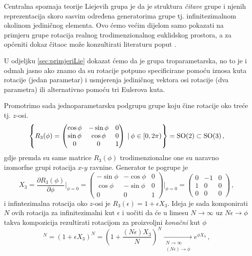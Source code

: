 Centralna spoznaja teorije Liejevih grupa je da je struktura \emph{čitave} grupe i
njenih reprezentacija skoro sasvim određena
generatorima grupe tj. infinitezimalnom okolinom jediničnog 
elementa.
Ovo ćemo većim dijelom samo pokazati na primjeru grupe rotacija realnog
trodimenzionalnog euklidskog prostora, a za općeniti
dokaz čitaoc može konzultirati literaturu poput \cite{Stilwell:2008}.


U odjeljku \ref{sec:primjeriLie} dokazat ćemo da je grupa  troparametarska,
no to je i odmah jasno ako znamo da su rotacije potpuno specificirane pomoću
iznosa kuta rotacije (jedan parametar) i usmjerenja jediničnog vektora osi rotacije (dva parametra)
ili alternativno pomoću tri Eulerova kuta.

Promotrimo sada jednoparametarsku podgrupu grupe  koju čine
rotacije oko treće tj. $z$-osi.
\begin{displaymath}
\left\{ R_3 (\phi) = 
\begin{pmatrix}
\cos\phi & -\sin\phi & 0 \\
\sin\phi & \cos\phi & 0 \\
0 & 0 & 1 
\end{pmatrix}
 \: | \: \phi \in [0, 2\pi) \right\} = \mathrm{SO}(2) \subset \mathrm{SO}(3) \,,
\end{displaymath}
gdje premda su same matrice $R_3 (\phi)$ trodimenzionalne one su
naravno izomorfne grupi  rotacija $x$-$y$ ravnine.
Generator te pogrupe je
\begin{equation} \label{eq:x3so3}
X_3 = \frac{\partial R_3 (\phi)}{\partial \phi}\Bigg|_{\phi=0}=
\begin{pmatrix}
-\sin\phi & -\cos\phi & 0 \\
\cos\phi & -\sin\phi & 0 \\
0 & 0 & 1 
\end{pmatrix}\Bigg|_{\phi=0} =
\begin{pmatrix}
0 & -1 & 0 \\
1 & 0 & 0 \\
0 & 0 & 0 
\end{pmatrix} \,,
\end{equation}
i infintezimalna rotacija oko $z$-osi je $R_3 (\epsilon) = 1 + \epsilon X_3$.
Ideja je sada komponirati $N$ ovih rotacija za infinitezimalni kut
$\epsilon$ i uočiti da
će u limesu $N \to\infty$ uz $N\epsilon \to \phi$ 
takva kompozicija rezultirati rotacijom za proizvoljni \emph{konačni}
kut $\phi$
\begin{displaymath}
[R_3(\epsilon)]^{N} = (1+\epsilon X_3)^N = \left(1+\frac{(N\epsilon)X_3}
 {N}\right)^N 
 \xrightarrow[\substack{N \to \infty \\ (N\epsilon) \to \phi}]{}
 e^{\phi X_3} \,,
\end{displaymath}
